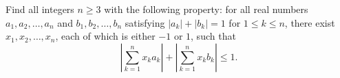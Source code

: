 Find all integers $n \geqslant 3$ with the following property: for all real numbers $a_1, a_2, \ldots, a_n$ and $b_1, b_2, \ldots, b_n$ satisfying $|a_k| + |b_k| = 1$ for $1 \leqslant k \leqslant n$, there exist $x_1, x_2, \ldots, x_n$, each of which is either $-1$ or $1$, such that
\[
\left| \sum_{k=1}^{n} x_k a_k \right| + \left| \sum_{k=1}^{n} x_k b_k \right| \leqslant 1.
\]
